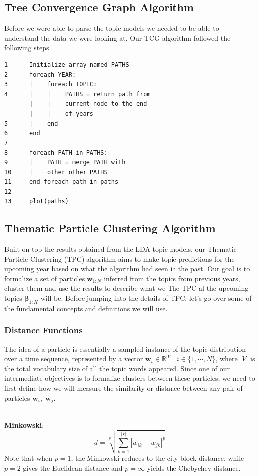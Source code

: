 \documentclass[conference]{IEEEtran}
\begin{document}
\subsection{Tree Convergence Graph Algorithm}
Before we were able to parse the topic models we needed to be able to understand the data we were looking at. Our TCG algorithm followed the following steps 


\begin{verbatim}
1      Initialize array named PATHS
2      foreach YEAR:
3      |    foreach TOPIC:
4      |    |    PATHS = return path from  
       |    |    current node to the end 
       |    |    of years
5      |    end 
6      end 
7     
8      foreach PATH in PATHS:  
9      |    PATH = merge PATH with
10     |    other other PATHS 
11     end foreach path in paths
12    
13     plot(paths)
\end{verbatim}   

\subsection{Thematic Particle Clustering Algorithm}

Built on top the results obtained from the LDA topic models, our Thematic Particle Clustering (TPC) algorithm aims to make topic predictions for the upcoming year based on what the algorithm had seen in the past. Our goal is to formalize a set of particles $\mathbf{w}_{1:N}$ inferred from the topics from previous years, cluster them and use the results to describe what we The TPC al the upcoming topics $\mathbf{\beta}_{1:K}$ will be. Before jumping into the details of TPC, let's go over some of the fundamental concepts and definitions we will use.

\subsubsection{Distance Functions}
The idea of a particle is essentially a sampled instance of the topic distribution over a time sequence, represented by a vector $\mathbf{w}_i\in \mathbb{R}^{|V|},\; i \in \{1,\cdots,N\}$, where $|V|$ is the total vocabulary size of all the topic words appeared. Since one of our intermediate objectives is to formalize clusters between these particles, we need to first define how we will measure the similarity or distance between any pair of particles $\mathbf{w}_i,\; \mathbf{w}_j$. 

\-\\
\textbf{Minkowski}: 
\begin{equation*}
	d = \sqrt[p]{\sum_{k=1}^{|V|}|w_{ik} - w_{jk}|^p}
\end{equation*}
 Note that when $p=1$, the Minkowski reduces to the city block distance, while $p=2$ gives the Euclidean distance and $p=\infty$ yields the Chebychev distance.
\end{document}
